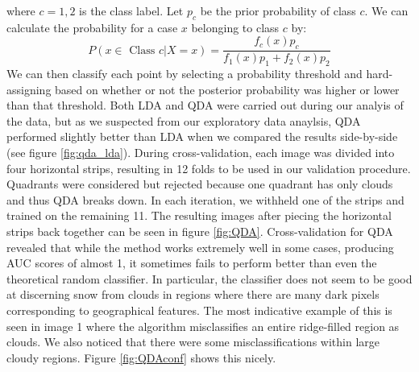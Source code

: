 \documentclass{article}\usepackage[]{graphicx}\usepackage[]{color}
\begin{document}
where $c=1,2$ is the class label.  Let $p_c$ be the prior probability of class $c$.  We can calculate the probability for a case $x$ belonging to class $c$ by:
\begin{equation}
P(x \in \textrm{ Class } c \vert X=x) = \frac{f_c(x) p_c}{f_1(x) p_1 + f_2(x) p_2}
\end{equation}
We can then classify each point by selecting a probability threshold and hard-assigning based on whether or not the posterior probability was higher or lower than that threshold.  Both LDA and QDA were carried out during our analyis of the data, but as we suspected from our exploratory data anaylsis, QDA performed slightly better than LDA when we compared the results side-by-side (see figure \ref{fig:qda_lda}).
During cross-validation, each image was divided into four horizontal strips, resulting in 12 folds to be used in our validation procedure.  Quadrants were considered but rejected because one quadrant has only clouds and thus QDA breaks down. In each iteration, we withheld one of the strips and trained on the remaining 11.  The resulting images after piecing the horizontal strips back together can be seen in figure \ref{fig:QDA}.
Cross-validation for QDA revealed that while the method works extremely well in some cases, producing AUC scores of almost 1, it sometimes fails to perform better than even the theoretical random classifier.  In particular, the classifier does not seem to be good at discerning snow from clouds in regions where there are many dark pixels corresponding to geographical features.  The most indicative example of this is seen in image 1 where the algorithm misclassifies an entire ridge-filled region as clouds.  We also noticed that there were some misclassifications within large cloudy regions.  Figure \ref{fig:QDAconf} shows this nicely.
\end{document}
